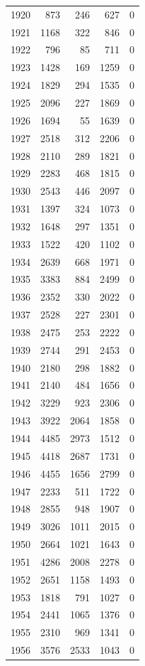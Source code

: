 \documentclass[
]{scrartcl}
\begin{document}
\begin{longtable}[]{@{}rrrrr@{}}
1920 & 873 & 246 & 627 & 0 \\
1921 & 1168 & 322 & 846 & 0 \\
1922 & 796 & 85 & 711 & 0 \\
1923 & 1428 & 169 & 1259 & 0 \\
1924 & 1829 & 294 & 1535 & 0 \\
1925 & 2096 & 227 & 1869 & 0 \\
1926 & 1694 & 55 & 1639 & 0 \\
1927 & 2518 & 312 & 2206 & 0 \\
1928 & 2110 & 289 & 1821 & 0 \\
1929 & 2283 & 468 & 1815 & 0 \\
1930 & 2543 & 446 & 2097 & 0 \\
1931 & 1397 & 324 & 1073 & 0 \\
1932 & 1648 & 297 & 1351 & 0 \\
1933 & 1522 & 420 & 1102 & 0 \\
1934 & 2639 & 668 & 1971 & 0 \\
1935 & 3383 & 884 & 2499 & 0 \\
1936 & 2352 & 330 & 2022 & 0 \\
1937 & 2528 & 227 & 2301 & 0 \\
1938 & 2475 & 253 & 2222 & 0 \\
1939 & 2744 & 291 & 2453 & 0 \\
1940 & 2180 & 298 & 1882 & 0 \\
1941 & 2140 & 484 & 1656 & 0 \\
1942 & 3229 & 923 & 2306 & 0 \\
1943 & 3922 & 2064 & 1858 & 0 \\
1944 & 4485 & 2973 & 1512 & 0 \\
1945 & 4418 & 2687 & 1731 & 0 \\
1946 & 4455 & 1656 & 2799 & 0 \\
1947 & 2233 & 511 & 1722 & 0 \\
1948 & 2855 & 948 & 1907 & 0 \\
1949 & 3026 & 1011 & 2015 & 0 \\
1950 & 2664 & 1021 & 1643 & 0 \\
1951 & 4286 & 2008 & 2278 & 0 \\
1952 & 2651 & 1158 & 1493 & 0 \\
1953 & 1818 & 791 & 1027 & 0 \\
1954 & 2441 & 1065 & 1376 & 0 \\
1955 & 2310 & 969 & 1341 & 0 \\
1956 & 3576 & 2533 & 1043 & 0 \\

\end{longtable}
\end{document}
